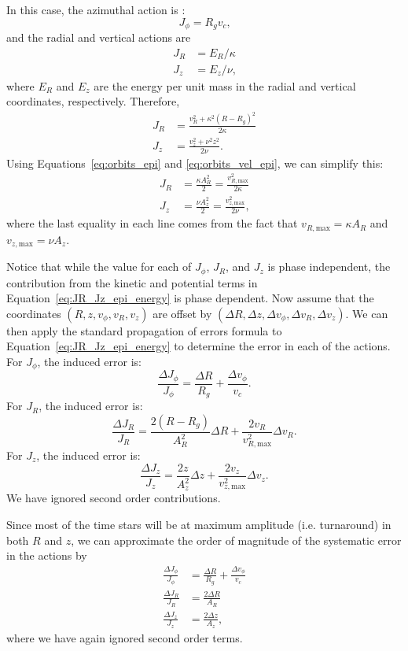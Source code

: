\documentclass[twocolumn]{aastex62}
\newcommand{\beq}{\begin{equation}}
\newcommand{\eeq}{\end{equation}}
\begin{document}
In this case, 
the azimuthal action is
\citep[][Section~3.5.3b]{2008gady.book.....B}:
\beq\label{eq:Jphi_epi}
J_{\phi} = R_g v_c\text{,}
\eeq
and the radial and vertical actions are
\beq\label{eq:JR_Jz_epi}
\begin{split}
J_R &= E_R / \kappa \\
J_z &= E_z / \nu\text{,} 
\end{split}
\eeq
where $E_R$ and $E_z$ are the energy per unit mass in the radial and vertical
coordinates, respectively. Therefore,
\beq\label{eq:JR_Jz_epi_energy}
\begin{split}
J_R &= \frac{v_R^2 + \kappa^2 (R-R_g)^2}{2\kappa} \\
J_z &= \frac{v_z^2 + \nu^2 z^2}{2\nu}\text{.}
\end{split}
\eeq
Using Equations~\eqref{eq:orbits_epi} and \eqref{eq:orbits_vel_epi}, we can
simplify this:
\beq\label{eq:JR_Jz_epi_final}
\begin{split}
J_R &= \frac{\kappa A_R^2}{2} = \frac{v_{R,\text{max}}^2}{2\kappa} \\
J_z &= \frac{\nu A_z^2}{2} = \frac{v_{z,\text{max}}^2}{2\nu}\text{,}
\end{split}
\eeq
where the last equality in each line comes from the fact that
$v_{R,\text{max}} = \kappa A_R$ and $v_{z,\text{max}} = \nu A_z$.

Notice that while the value for each of $J_{\phi}$, $J_R$, and $J_z$ is phase
independent, the contribution from the kinetic and potential terms in
Equation~\eqref{eq:JR_Jz_epi_energy} is phase dependent. Now assume that the
coordinates $(R, z, v_{\phi}, v_R, v_z)$ are offset by $(\Delta R, \Delta z,
\Delta v_{\phi}, \Delta v_R, \Delta v_z)$. We can then apply the standard
propagation of errors formula to Equation~\eqref{eq:JR_Jz_epi_energy} to
determine the error in each of the actions. For $J_{\phi}$, the induced error
is:
\beq\label{eq:induced_Jphi}
\frac{\Delta J_{\phi}}{J_{\phi}} = \frac{\Delta R}{R_g}
                                    + \frac{\Delta v_{\phi}}{v_c}\text{.}
\eeq
For $J_R$, the induced error is:
\beq\label{eq:induced_JR}
\frac{\Delta J_R}{J_R} = \frac{2(R-R_g)}{A_R^2}\Delta R
                         + \frac{2v_R}{v_{R,\text{max}}^2} \Delta v_R \text{.}
\eeq
For $J_z$, the induced error is:
\beq\label{eq:induced_Jz}
\frac{\Delta J_z}{J_z} = \frac{2z}{A_z^2}\Delta z
                         + \frac{2v_z}{v_{z,\text{max}}^2} \Delta v_z \text{.}
\eeq
We have ignored second order contributions.

Since most of the time stars will be at maximum amplitude (i.e. turnaround) in
both $R$ and $z$, we can approximate the order of magnitude of the systematic
error in the actions by
\beq\label{eq:Ji_err_mosttime}
\begin{split}
\frac{\Delta J_{\phi}}{J_{\phi}} &= \frac{\Delta R}{R_g}
                                    + \frac{\Delta v_{\phi}}{v_c} \\
\frac{\Delta J_{R}}{J_{R}} &= \frac{2\Delta R}{A_R} \\
\frac{\Delta J_{z}}{J_{z}} &= \frac{2\Delta z}{A_z} \text{,}
\end{split}
\eeq
where we have again ignored second order terms.
\end{document}
